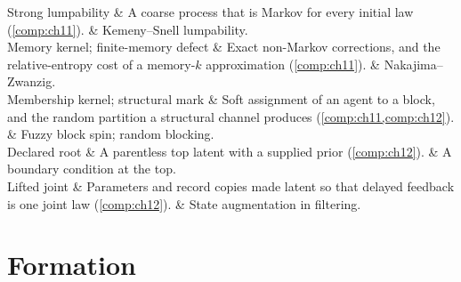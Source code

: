 \begin{decoder}
Strong lumpability & A coarse process that is Markov for every initial law (\cref{comp:ch11}). & Kemeny--Snell lumpability. \\
Memory kernel; finite-memory defect & Exact non-Markov corrections, and the relative-entropy cost of a memory-$k$ approximation (\cref{comp:ch11}). & Nakajima--Zwanzig. \\
Membership kernel; structural mark & Soft assignment of an agent to a block, and the random partition a structural channel produces (\cref{comp:ch11,comp:ch12}). & Fuzzy block spin; random blocking. \\
Declared root & A parentless top latent with a supplied prior (\cref{comp:ch12}). & A boundary condition at the top. \\
Lifted joint & Parameters and record copies made latent so that delayed feedback is one joint law (\cref{comp:ch12}). & State augmentation in filtering. \\
\end{decoder}

\section*{Formation}

